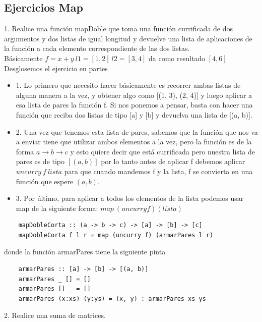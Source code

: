 \documentclass[10pt,a4paper]{article}
\begin{document}
\subsection*{Ejercicios Map}
\label{subsec:map_ejercicios}
1. Realice una función mapDoble que toma una función currificada de dos argumentos y dos listas de igual longitud y devuelve una lista de aplicaciones de la función a cada elemento correspondiente de las dos listas. \\
Básicamente $f=x+y \ l1 = [1, 2] \ l2 = [3, 4] $ da como resultado $[4, 6]$ \\
Desglosemos el ejercicio en partes 
\begin{itemize}
    \item 1. Lo primero que necesito hacer básicamente es recorrer ambas listas de alguna manera a la vez, y obtener algo como [(1, 3), (2, 4)] y luego aplicar a esa lista de pares la función f.
    Si nos ponemos a pensar, basta con hacer una función que reciba dos listas de tipo [a] y [b] y devuelva una lista de [(a, b)]. 
    \item 2. Una vez que tenemos esta lista de pares, sabemos que la función que nos va a enviar tiene que utilizar ambos elementos a la vez, pero la función es de la forma $a \rightarrow b \rightarrow c$ y esto quiere decir que está currificada pero nuestra lista de pares es de tipo $[(a, b)]$ por lo tanto antes de aplicar f debemos aplicar $ uncurry \ f \ lista$ para que cuando mandemos f y la lista, f se convierta en una función que espere $(a, b)$.
    \item 3. Por último, para aplicar a todos los elementos de la lista podemos usar map de la siguiente forma: $map \ (uncurry f) (lista)$
\end{itemize}
\begin{lstlisting}
    mapDobleCorta :: (a -> b -> c) -> [a] -> [b] -> [c]
    mapDobleCorta f l r = map (uncurry f) (armarPares l r)
\end{lstlisting}
donde la función armarPares tiene la siguiente pinta 
\begin{lstlisting}
    armarPares :: [a] -> [b] -> [(a, b)]
    armarPares _ [] = []
    armarPares [] _ = []
    armarPares (x:xs) (y:ys) = (x, y) : armarPares xs ys 
\end{lstlisting}
2. Realice una suma de matrices.
\end{document}
